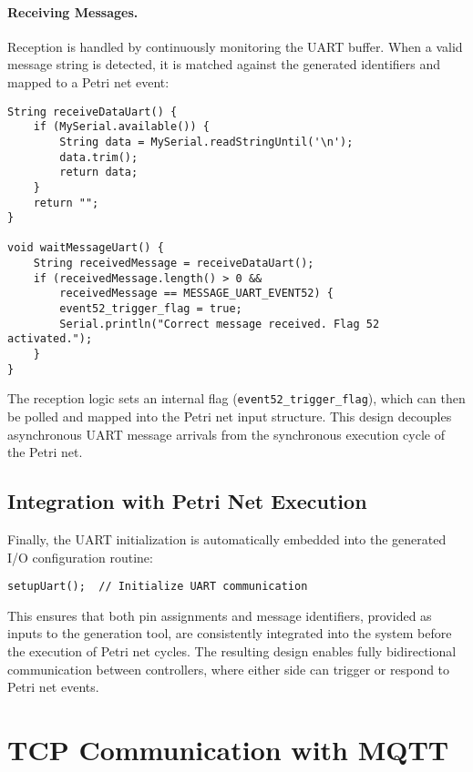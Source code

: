 \paragraph{Receiving Messages.}  
Reception is handled by continuously monitoring the UART buffer. When a valid message string is detected, it is matched against the generated identifiers and mapped to a Petri net event:
\begin{verbatim}
String receiveDataUart() {
    if (MySerial.available()) {
        String data = MySerial.readStringUntil('\n');
        data.trim();
        return data;
    }
    return "";
}

void waitMessageUart() {
    String receivedMessage = receiveDataUart();
    if (receivedMessage.length() > 0 && 
        receivedMessage == MESSAGE_UART_EVENT52) {
        event52_trigger_flag = true;
        Serial.println("Correct message received. Flag 52 activated.");
    }
}
\end{verbatim}

\noindent
The reception logic sets an internal flag (\texttt{event52\_trigger\_flag}), which can then be polled and mapped into the Petri net input structure. This design decouples asynchronous UART message arrivals from the synchronous execution cycle of the Petri net.

\subsection{Integration with Petri Net Execution}
Finally, the UART initialization is automatically embedded into the generated I/O configuration routine:
\begin{verbatim}
setupUart();  // Initialize UART communication
\end{verbatim}
This ensures that both pin assignments and message identifiers, provided as inputs to the generation tool, are consistently integrated into the system before the execution of Petri net cycles. The resulting design enables fully bidirectional communication between controllers, where either side can trigger or respond to Petri net events.

\section{TCP Communication with MQTT}
\label{sec:tcp_mqtt_implementation}

